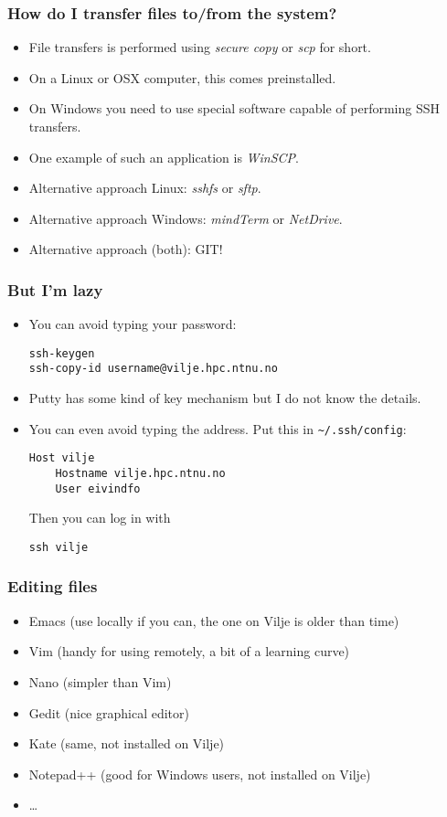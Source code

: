 \begin{frame}
  \frametitle{How do I transfer files to/from the system?}
  \begin{itemize}
  \item File transfers is performed using \emph{secure copy} or \emph{scp} for short.
  \item On a Linux or OSX computer, this comes preinstalled.
  \item On Windows you need to use special software capable of performing SSH transfers.
  \item One example of such an application is \emph{WinSCP}.
  \item Alternative approach Linux: \emph{sshfs} or \emph{sftp}.
  \item Alternative approach Windows: \emph{mindTerm} or \emph{NetDrive}.
  \item Alternative approach (both): GIT!
  \end{itemize}
\end{frame}

\begin{frame}[fragile]
  \frametitle{But I'm lazy}
  \begin{itemize}
  \item You can avoid typing your password:
\begin{lstlisting}[style=shell]
ssh-keygen
ssh-copy-id username@vilje.hpc.ntnu.no
\end{lstlisting}
  \item Putty has some kind of key mechanism but I do not know the details.
  \item You can even avoid typing the address. Put this in
    \texttt{\textasciitilde/.ssh/config}:
\begin{lstlisting}[style=shell]
Host vilje
    Hostname vilje.hpc.ntnu.no
    User eivindfo
\end{lstlisting}
    Then you can log in with
\begin{lstlisting}[style=shell]
ssh vilje
\end{lstlisting}
  \end{itemize}
\end{frame}

\begin{frame}
  \frametitle{Editing files}
  \begin{itemize}
  \item Emacs (use locally if you can, the one on Vilje is older than time)
  \item Vim (handy for using remotely, a bit of a learning curve)
  \item Nano (simpler than Vim)
  \item Gedit (nice graphical editor)
  \item Kate (same, not installed on Vilje)
  \item Notepad++ (good for Windows users, not installed on Vilje)
  \item \ldots
  \end{itemize}
\end{frame}

